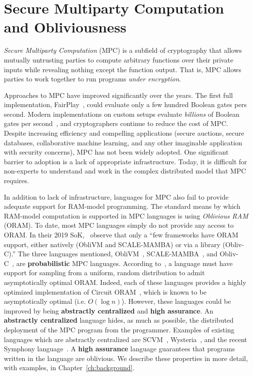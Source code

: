\documentclass{report}
\begin{document}
\section{Secure Multiparty Computation and Obliviousness}
\label{sec:intro-mpc}

\emph{Secure Multiparty Computation} (MPC) is a subfield of cryptography
that allows mutually untrusting parties to compute arbitrary functions over their private inputs while revealing nothing
except the function output. That is, MPC allows parties to work together to run programs \emph{under encryption}.

Approaches to MPC have improved significantly over the years. The first full implementation, FairPlay~\cite{}, could evaluate
only a few hundred Boolean gates pers second. Modern implementations on custom setups evaluate \emph{billions} of Boolean gates per
second~\cite{}, and cryptographers continue to reduce the cost of MPC. Despite increasing efficiency and compelling applications
(secure auctions, secure databases, collaborative machine learning, and any other imaginable application with security concerns),
MPC has not been widely adopted. One significant barrier to adoption is a lack of appropriate infrastructure. Today, it is difficult
for non-experts to understand and work in the complex distributed model that MPC requires.

In addition to lack of infrastructure, languages for MPC also fail to provide adequate support for RAM-model programming. The standard
means by which RAM-model computation is supported in MPC languages is using \emph{Oblivious RAM} (ORAM). To date, most MPC languages
simply do not provide any access to ORAM. In their 2019 SoK,~\citet{} observe that only a ``few frameworks have ORAM support, either
natively (ObliVM and SCALE-MAMBA) or via a library (Obliv-C).'' The three languages mentioned, ObliVM~\cite{}, SCALE-MAMBA~\cite{}, and
Obliv-C~\cite{}, are \textbf{probabilistic} MPC languages. According to~\citet{}, a language must have support for sampling from a uniform,
random distribution to admit asymptotically optimal ORAM. Indeed, each of these languages provides a highly optimized implementation of
Circuit ORAM~\cite{}, which is known to be asymptotically optimal (i.e. $O(\log{n})$). However, these languages could be improved by
being \textbf{abstractly centralized} and \textbf{high assurance}. An \textbf{abstractly centralized} language hides, as much as possible,
the distributed deployment of the MPC program from the programmer. Examples of existing languages which are abstractly centralized are
SCVM~\cite{}, Wysteria~\cite{}, and the recent Symphony language~\cite{}. A \textbf{high assurance} language guarantees that programs written
in the language are oblivious. We describe these properties in more detail, with examples, in Chapter~\ref{ch:background}.
\end{document}
